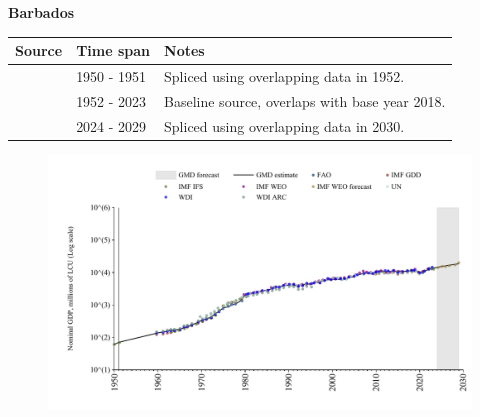 \documentclass[12pt,a4paper,landscape]{article}
\begin{document}
\begin{adjustbox}{max totalsize={\paperwidth}{\paperheight},center}
\begin{minipage}[t][\textheight][t]{\textwidth}
\vspace*{0.5cm}
{}
\begin{center}
{\Large\bfseries Barbados}
\end{center}
\vspace{0.5cm}
\begin{table}[H]
\centering
\small
\begin{tabular}{|l|l|l|}
\hline
\textbf{Source} & \textbf{Time span} & \textbf{Notes} \\
\hline
\rowcolor{white}\cite{IMF_IFS}& 1950 - 1951 &Spliced using overlapping data in 1952.\\
\rowcolor{lightgray}\cite{WDI}& 1952 - 2023 &Baseline source, overlaps with base year 2018.\\
\rowcolor{white}\cite{IMF_WEO_forecast}& 2024 - 2029 &Spliced using overlapping data in 2030.\\
\hline
\end{tabular}
\end{table}
\begin{figure}[H]
\centering
\includegraphics[width=\textwidth,height=0.6\textheight,keepaspectratio]{graphs/BRB_nGDP.pdf}
\end{figure}
\end{minipage}
\end{adjustbox}
\end{document}
